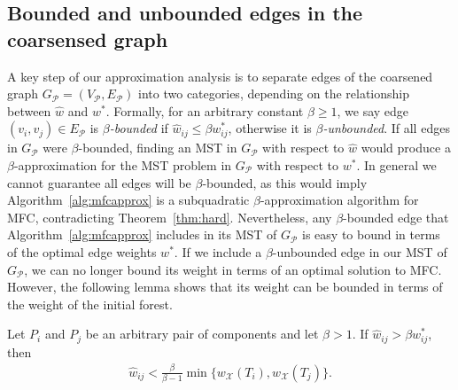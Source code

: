 \subsection{Bounded and unbounded edges in the coarsensed graph}
A key step of our approximation analysis is to separate edges of the coarsened graph $G_\mathcal{P} = (V_\mathcal{P},E_\mathcal{P})$ into two categories, depending on the relationship between $\hat{w}$ and $w^*$.
Formally, for an arbitrary constant $\beta \geq 1$, we say edge $(v_i,v_j) \in E_\mathcal{P}$ is \textit{$\beta$-bounded} if $\hat{w}_{ij}  \leq \beta w^*_{ij}$, otherwise it is \textit{$\beta$-unbounded}. 
If all edges in $G_\mathcal{P}$ were $\beta$-bounded, finding an MST in $G_\mathcal{P}$ with respect to $\hat{w}$ would produce a $\beta$-approximation for the MST problem in $G_\mathcal{P}$ with respect to $w^*$. In general we cannot guarantee all edges will be $\beta$-bounded, as this would imply Algorithm~\ref{alg:mfcapprox} is a subquadratic $\beta$-approximation algorithm for MFC, contradicting Theorem~\ref{thm:hard}. Nevertheless, any $\beta$-bounded edge that Algorithm~\ref{alg:mfcapprox} includes in its MST of $G_\mathcal{P}$ is easy to bound in terms of the optimal edge weights $w^*$. 
%
If we include a $\beta$-unbounded edge in our MST of $G_\mathcal{P}$, we can no longer bound its weight in terms of an optimal solution to MFC. However, the following lemma shows that its weight can be bounded in terms of the weight of the initial forest.
\begin{lemma}
	\label{lem:unboundededges}
	Let $P_i$ and $P_j$ be an arbitrary pair of components and let $\beta > 1$. If $\hat{w}_{ij} > \beta w^*_{ij}$, then 
	\begin{align}
		\hat{w}_{ij} <
		\frac{\beta}{\beta - 1}  \min\{w_\mathcal{X}(T_i), w_\mathcal{X}(T_j)\}.
	\end{align}
\end{lemma}
